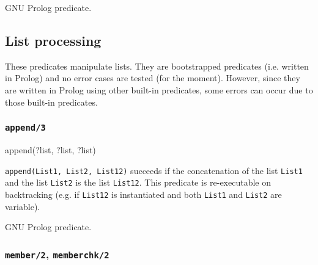 \begin{PlErrors}




\end{PlErrors}

\Portability

GNU Prolog predicate.

\subsection{List processing}

These predicates manipulate lists. They are bootstrapped predicates (i.e.
written in Prolog) and no error cases are tested (for the moment). However,
since they are written in Prolog using other built-in predicates, some
errors can occur due to those built-in predicates.

\subsubsection{\texttt{append/3}}

\begin{TemplatesOneCol}
append(?list, ?list, ?list)

\end{TemplatesOneCol}

\Description

\texttt{append(List1, List2, List12)} succeeds if the concatenation of the
list \texttt{List1} and the list \texttt{List2} is the list \texttt{List12}.
This predicate is re-executable on backtracking (e.g. if \texttt{List12} is
instantiated and both \texttt{List1} and \texttt{List2} are variable).

\PlErrorsNone

\Portability

GNU Prolog predicate.

\subsubsection{\texttt{member/2},
               \texttt{memberchk/2}}

